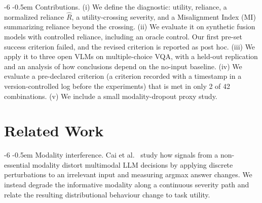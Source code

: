 \documentclass[graybox]{svmult}
\makeatletter
\newcommand{\checknum}[2]{#1}
\renewcommand\paragraph{\@startsection{paragraph}{4}{\z@}%
  {-6\p@ \@plus -2\p@ \@minus -2\p@}%
  {-0.5em}%
  {\normalfont\normalsize\bfseries}}
\makeatother
\begin{document}
\paragraph{Contributions.}
(i) We define the diagnostic: utility, reliance, a normalized reliance
$\hat R$, a utility-crossing severity, and a Misalignment Index (MI)
summarizing reliance beyond the crossing. (ii) We evaluate it on synthetic
fusion models with controlled reliance, including an oracle control. Our
first pre-set success criterion failed, and the revised criterion is
reported as post hoc. (iii) We apply it to three open VLMs on
multiple-choice VQA, with a held-out replication and an analysis of how
conclusions depend on the no-input baseline. (iv) We evaluate a pre-declared criterion (a criterion recorded with a timestamp in a version-controlled log before the experiments) that is met in only \checknum{2}{criterion:status:count_met} of 42
combinations. (v) We
include a small modality-dropout proxy study.

\section{Related Work}
\label{sec:related}

\paragraph{Modality interference.}
Cai et al.~\cite{cai2025interference} study how signals from a
non-essential modality distort multimodal LLM decisions by applying discrete
perturbations to an irrelevant input and measuring argmax answer changes.
We instead degrade the informative modality along a continuous severity path
and relate the resulting distributional behaviour change to task utility.
\end{document}

